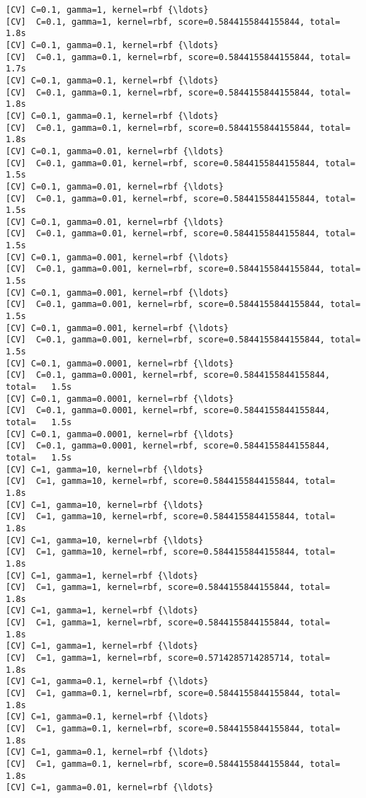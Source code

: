 \documentclass[11pt]{article}
\begin{document}
\begin{Verbatim}[commandchars=\\\{\}]
[CV] C=0.1, gamma=1, kernel=rbf {\ldots}
[CV]  C=0.1, gamma=1, kernel=rbf, score=0.5844155844155844, total=   1.8s
[CV] C=0.1, gamma=0.1, kernel=rbf {\ldots}
[CV]  C=0.1, gamma=0.1, kernel=rbf, score=0.5844155844155844, total=   1.7s
[CV] C=0.1, gamma=0.1, kernel=rbf {\ldots}
[CV]  C=0.1, gamma=0.1, kernel=rbf, score=0.5844155844155844, total=   1.8s
[CV] C=0.1, gamma=0.1, kernel=rbf {\ldots}
[CV]  C=0.1, gamma=0.1, kernel=rbf, score=0.5844155844155844, total=   1.8s
[CV] C=0.1, gamma=0.01, kernel=rbf {\ldots}
[CV]  C=0.1, gamma=0.01, kernel=rbf, score=0.5844155844155844, total=   1.5s
[CV] C=0.1, gamma=0.01, kernel=rbf {\ldots}
[CV]  C=0.1, gamma=0.01, kernel=rbf, score=0.5844155844155844, total=   1.5s
[CV] C=0.1, gamma=0.01, kernel=rbf {\ldots}
[CV]  C=0.1, gamma=0.01, kernel=rbf, score=0.5844155844155844, total=   1.5s
[CV] C=0.1, gamma=0.001, kernel=rbf {\ldots}
[CV]  C=0.1, gamma=0.001, kernel=rbf, score=0.5844155844155844, total=   1.5s
[CV] C=0.1, gamma=0.001, kernel=rbf {\ldots}
[CV]  C=0.1, gamma=0.001, kernel=rbf, score=0.5844155844155844, total=   1.5s
[CV] C=0.1, gamma=0.001, kernel=rbf {\ldots}
[CV]  C=0.1, gamma=0.001, kernel=rbf, score=0.5844155844155844, total=   1.5s
[CV] C=0.1, gamma=0.0001, kernel=rbf {\ldots}
[CV]  C=0.1, gamma=0.0001, kernel=rbf, score=0.5844155844155844, total=   1.5s
[CV] C=0.1, gamma=0.0001, kernel=rbf {\ldots}
[CV]  C=0.1, gamma=0.0001, kernel=rbf, score=0.5844155844155844, total=   1.5s
[CV] C=0.1, gamma=0.0001, kernel=rbf {\ldots}
[CV]  C=0.1, gamma=0.0001, kernel=rbf, score=0.5844155844155844, total=   1.5s
[CV] C=1, gamma=10, kernel=rbf {\ldots}
[CV]  C=1, gamma=10, kernel=rbf, score=0.5844155844155844, total=   1.8s
[CV] C=1, gamma=10, kernel=rbf {\ldots}
[CV]  C=1, gamma=10, kernel=rbf, score=0.5844155844155844, total=   1.8s
[CV] C=1, gamma=10, kernel=rbf {\ldots}
[CV]  C=1, gamma=10, kernel=rbf, score=0.5844155844155844, total=   1.8s
[CV] C=1, gamma=1, kernel=rbf {\ldots}
[CV]  C=1, gamma=1, kernel=rbf, score=0.5844155844155844, total=   1.8s
[CV] C=1, gamma=1, kernel=rbf {\ldots}
[CV]  C=1, gamma=1, kernel=rbf, score=0.5844155844155844, total=   1.8s
[CV] C=1, gamma=1, kernel=rbf {\ldots}
[CV]  C=1, gamma=1, kernel=rbf, score=0.5714285714285714, total=   1.8s
[CV] C=1, gamma=0.1, kernel=rbf {\ldots}
[CV]  C=1, gamma=0.1, kernel=rbf, score=0.5844155844155844, total=   1.8s
[CV] C=1, gamma=0.1, kernel=rbf {\ldots}
[CV]  C=1, gamma=0.1, kernel=rbf, score=0.5844155844155844, total=   1.8s
[CV] C=1, gamma=0.1, kernel=rbf {\ldots}
[CV]  C=1, gamma=0.1, kernel=rbf, score=0.5844155844155844, total=   1.8s
[CV] C=1, gamma=0.01, kernel=rbf {\ldots}

\end{Verbatim}
\end{document}
